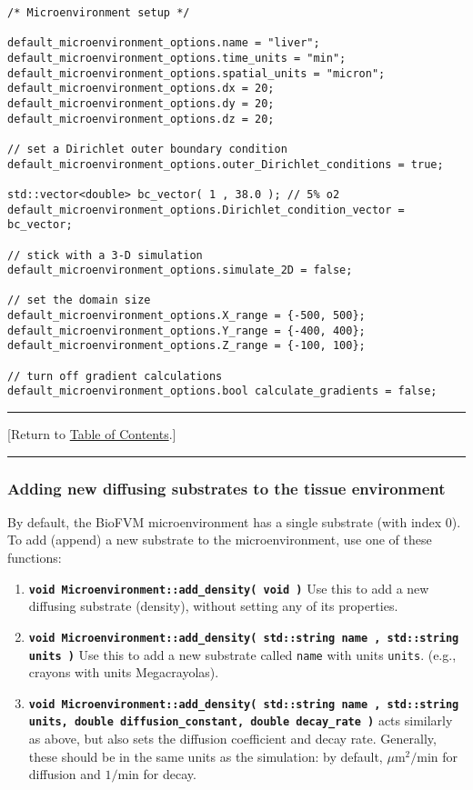 \documentclass[12pt]{article}
\newcommand{\micron}{\mu\textrm{m}}
\renewcommand{\v}{\verb}
\newcommand{\smallcode}[1]{\textbf{\texttt{#1}}}
\newcommand{\TOClink}{\begin{center}\hrule\vskip-10pt\phantom{.}\hfill[Return to \hyperlink{TOC}{Table of Contents}.]\hfill\phantom{.}\vskip3pt\hrule\end{center}}
\begin{document}
\begin{verbatim}
/* Microenvironment setup */ 

default_microenvironment_options.name = "liver"; 
default_microenvironment_options.time_units = "min"; 
default_microenvironment_options.spatial_units = "micron"; 
default_microenvironment_options.dx = 20; 
default_microenvironment_options.dy = 20;  
default_microenvironment_options.dz = 20; 
	
// set a Dirichlet outer boundary condition 
default_microenvironment_options.outer_Dirichlet_conditions = true;

std::vector<double> bc_vector( 1 , 38.0 ); // 5% o2  
default_microenvironment_options.Dirichlet_condition_vector = bc_vector; 
	
// stick with a 3-D simulation 
default_microenvironment_options.simulate_2D = false; 

// set the domain size 
default_microenvironment_options.X_range = {-500, 500};  
default_microenvironment_options.Y_range = {-400, 400}; 
default_microenvironment_options.Z_range = {-100, 100}; 
	
// turn off gradient calculations 
default_microenvironment_options.bool calculate_gradients = false; 
\end{verbatim}


\TOClink 
\subsubsection{Adding new diffusing substrates to the tissue environment}
\label{sec:BioFVM_add_substrates}
By default, the BioFVM microenvironment has a single substrate (with index 0). 
To add (append) a new substrate to the microenvironment, use one of these functions: 

\begin{enumerate}
\item 
\smallcode{void Microenvironment::add\_density( void )} Use this to add a new diffusing 
substrate (density), without setting any of its properties. 

\item 
\smallcode{void Microenvironment::add\_density( std::string name , std::string units )} Use this 
to add a new substrate called \v|name| with units \v|units|. (e.g., crayons with units Megacrayolas). 

\item 
\smallcode{void Microenvironment::add\_density( std::string name , std::string units, double diffusion\_constant, double decay\_rate )} acts similarly as above, but also sets the diffusion coefficient and decay rate. Generally, 
these should be in the same units as the simulation: by default, $\micron^2/\textrm{min}$ for diffusion 
and $1/\textrm{min}$ for decay. 
\end{enumerate}
\end{document}
